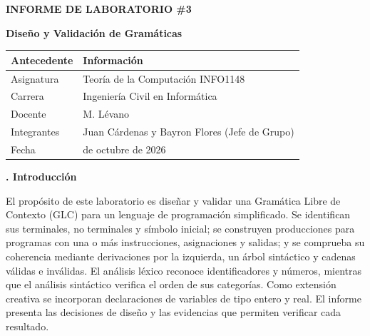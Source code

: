 \documentclass[10pt,a4paper]{article}
\newcommand{\ReportSection}[1]{\par{\color{Accent}\bfseries\fontsize{16}{20}\selectfont #1\par}\vspace{5pt}}
\begin{document}
\color{BodyColor}\fontsize{9.2}{13.0}\selectfont

\begin{center}
{\color{black}\bfseries\fontsize{17}{21}\selectfont INFORME DE LABORATORIO \#3\par}
\vspace{4pt}
{\color{black}\bfseries\fontsize{15}{19}\selectfont Diseño y Validación de Gramáticas\par}
\end{center}
\vspace{9pt}

\begingroup\fontsize{10}{13}\selectfont
\setlength{\tabcolsep}{7pt}\renewcommand{\arraystretch}{1.3}
\noindent\begin{tabularx}{\linewidth}{|>{\raggedright\arraybackslash}p{0.38\dimexpr\linewidth-4\tabcolsep-3\arrayrulewidth\relax}|>{\raggedright\arraybackslash}X|}\hline
\rowcolor{TableHead}\centering\textbf{Antecedente} & \centering\arraybackslash\textbf{Información} \\\hline
Asignatura & Teoría de la Computación INFO1148 \\\hline
Carrera & Ingeniería Civil en Informática \\\hline
Docente & M. Lévano \\\hline
Integrantes & Juan Cárdenas y Bayron Flores (Jefe de Grupo) \\\hline
Fecha & 21 de octubre de 2026 \\\hline
\end{tabularx}\par\endgroup
\vspace{10pt}

\ReportSection{1. Introducción}

El propósito de este laboratorio es diseñar y validar una Gramática Libre de Contexto (GLC) para un lenguaje de programación simplificado. Se identifican sus terminales, no terminales y símbolo inicial; se construyen producciones para programas con una o más instrucciones, asignaciones y salidas; y se comprueba su coherencia mediante derivaciones por la izquierda, un árbol sintáctico y cadenas válidas e inválidas. El análisis léxico reconoce identificadores y números, mientras que el análisis sintáctico verifica el orden de sus categorías. Como extensión creativa se incorporan declaraciones de variables de tipo entero y real. El informe presenta las decisiones de diseño y las evidencias que permiten verificar cada resultado.
\par
\end{document}

